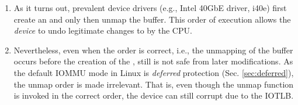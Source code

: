 \begin{enumerate}[label=(\roman*),wide, labelwidth=!, labelindent=0pt]

\item As it turns out, prevalent device drivers (e.g., Intel 40GbE driver, i40e) first create an \skb{} and only then unmap the buffer. This order of execution allows the \emph{device} to undo legitimate changes to \shinfo{} by the CPU. 

\item Nevertheless, even when the order is correct, i.e., the unmapping of the buffer occurs before the creation of the \skb{}, still \shinfo{} is not safe from later modifications. As the default IOMMU mode in Linux is \emph{deferred} protection (Sec. \ref{sec:deferred}), the unmap order is made irrelevant. That is, even though the unmap function is invoked in the correct order, the device can still corrupt \shinfo{} due to the IOTLB.  


\end{enumerate}
